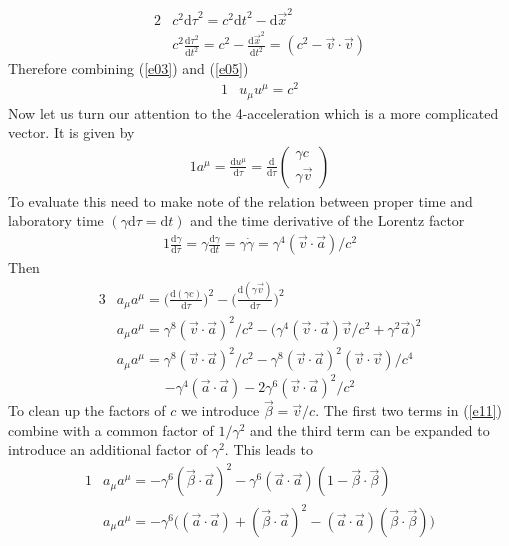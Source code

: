 \documentclass[]{article}
\numberwithin{equation}{subsection}
\begin{document}
\begin{alignat}{2}
	\label{e04}	&c^{2}{\mathrm{d}\tau}^{2}=c^{2}{\mathrm{d}t}^{2}-{\mathrm{d}\vec{x}}^{2}\\
	\label{e05}	&c^{2}\frac{\mathrm{d}\tau^{2}}{\mathrm{d}t^{2}}=c^{2}-\frac{\mathrm{d}\vec{x}^{2}}{\mathrm{d}t^{2}}=(c^{2}-\vec{v}\cdot\vec{v})
\end{alignat}
Therefore combining (\ref{e03}) and (\ref{e05})
\begin{alignat}{1}
	\label{e06}	&u_{\mu}u^{\mu}=c^{2}
\end{alignat}
Now let us turn our attention to the 4-acceleration which is a more complicated vector. It is given by  
\begin{alignat}{1}
	\label{e07}	a^{\mu}=\frac{\mathrm{d}u^{\mu}}{\mathrm{d}\tau}=\frac{\mathrm{d}}{\mathrm{d}\tau}
	\begin{pmatrix}
		\gamma c\\
		\gamma\vec{v}
	\end{pmatrix}
\end{alignat}
To evaluate this need to make note of the relation between proper time and laboratory time $(\gamma\mathrm{d}\tau=\mathrm{d}t)$ and the time derivative of the Lorentz factor
\begin{alignat}{1}
	\label{e08}	\frac{\mathrm{d}\gamma}{\mathrm{d}\tau}=\gamma\frac{\mathrm{d}\gamma}{\mathrm{d}t}=\gamma\dot{\gamma}=\gamma^{4}(\vec{v}\cdot\vec{a})/c^{2}
\end{alignat}
Then  
\begin{alignat}{3}
	\label{e09}	&a_{\mu}a^{\mu}=\big(\frac{\mathrm{d}(\gamma c)}{\mathrm{d}\tau}\big)^{2}-\big(\frac{\mathrm{d}(\gamma \vec{v})}{\mathrm{d}\tau}\big)^{2}\\
	\label{e10}	&a_{\mu}a^{\mu}=\gamma^{8}(\vec{v}\cdot\vec{a})^{2}/c^{2}-\big(\gamma^{4}(\vec{v}\cdot\vec{a})\vec{v}/c^{2}+\gamma^{2}\vec{a}\big)^{2}\\
	\label{e11}	&a_{\mu}a^{\mu}=\gamma^{8}(\vec{v}\cdot\vec{a})^{2}/c^{2}-\gamma^{8}(\vec{v}\cdot\vec{a})^{2}(\vec{v}\cdot\vec{v})/c^{4}
\end{alignat}
$$
	-\gamma^{4}(\vec{a}\cdot\vec{a})-2\gamma^{6}(\vec{v}\cdot\vec{a})^{2}/c^{2}
$$
To clean up the factors of $c$ we introduce $\vec{\beta}=\vec{v}/c$. The first two terms in (\ref{e11}) combine with a common factor of $1/\gamma^{2}$ and the third term can be expanded to introduce an additional factor of $\gamma^{2}$. This leads to  
\begin{alignat}{1}
	\label{e12}	&a_{\mu}a^{\mu}=-\gamma^{6}(\vec{\beta}\cdot\vec{a})^{2}-\gamma^{6}(\vec{a}\cdot\vec{a})(1-\vec{\beta}\cdot\vec{\beta})\\
	\label{e13}	&a_{\mu}a^{\mu}=-\gamma^{6}\Big((\vec{a}\cdot\vec{a})+(\vec{\beta}\cdot\vec{a})^{2}-(\vec{a}\cdot\vec{a})(\vec{\beta}\cdot\vec{\beta})\Big)
\end{alignat}
\end{document}
